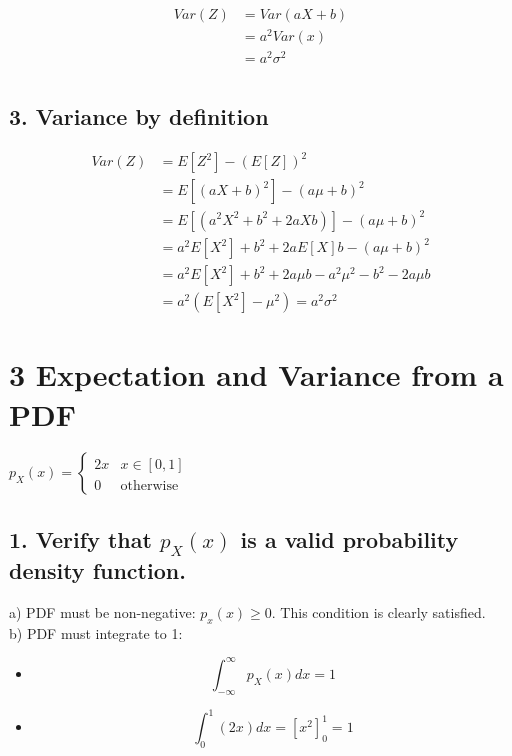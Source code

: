 \documentclass[12pt]{article}
\begin{document}
\begin{align*}
    Var(Z) &= Var(aX + b)\\[10pt]
    &= a^2 Var(x)\\[10pt]
    &= a^2\sigma^2\\
\end{align*}

\subsection*{3. Variance by definition}
\label{subsec:2.3}

\begin{align*}
    Var(Z) &= E[Z^2] - (E[Z])^2\\[10pt]
    &= E[(aX+b)^2] - (a\mu + b)^2\\[10pt]
    &= E[(a^{2}X^2+b^2 + 2aXb)] - (a\mu + b)^2\\[10pt]
    &= a^2 E[X^2] + b^2 + 2aE[X]b - (a\mu + b)^2 \\[10pt]
    &= a^2 E[X^2] + b^2 + 2a\mu b - a^2\mu^2 - b^2 - 2a\mu b \\[10pt]
    &= a^2(E[X^2] - \mu^2) = a^2\sigma^2
\end{align*}

\newpage
\section*{3 \quad Expectation and Variance from a PDF}
\label{sec:prob3}

$p_X(x) = \begin{cases} 2x & x \in [0,1] \\ 0 & \text{otherwise} \end{cases}$

\subsection*{1. Verify that $p_X(x)$ is a valid probability density function.}
\label{subsec:3.1}

a) PDF must be non-negative: $p_x(x) \ge 0$. This condition is clearly satisfied. \\[10pt]
b) PDF must integrate to 1:
\begin{itemize}
    \item[] \[\int_{-\infty}^{\infty} p_X(x) dx = 1\]
    \item[] \[\int_0^1 (2x) dx = \left[x^2\right]_0^1 = 1\]
\end{itemize}
\end{document}
